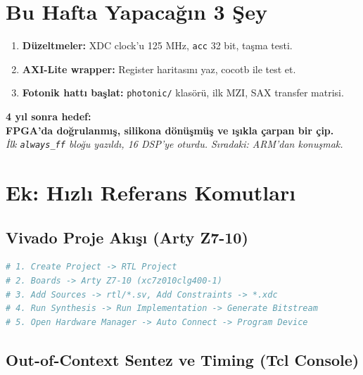 \documentclass[11pt,a4paper]{article}
\begin{document}
\section{Bu Hafta Yapacağın 3 Şey}

\begin{enumerate}
    \item \textbf{Düzeltmeler:} XDC clock'u 125 MHz, \texttt{acc} 32 bit, taşma testi.
    \item \textbf{AXI-Lite wrapper:} Register haritasını yaz, cocotb ile test et.
    \item \textbf{Fotonik hattı başlat:} \texttt{photonic/} klasörü, ilk MZI, SAX transfer matrisi.
\end{enumerate}

\begin{center}
\begin{tcolorbox}[colback=successbg, colframe=green!50!black, width=0.9\textwidth, arc=3mm]
\centering
\large\textbf{4 yıl sonra hedef:}\\[0.3cm]
\textbf{FPGA'da doğrulanmış, silikona dönüşmüş ve ışıkla çarpan bir çip.}\\[0.3cm]
\textit{İlk \texttt{always\_ff} bloğu yazıldı, 16 DSP'ye oturdu. Sıradaki: ARM'dan konuşmak.}
\end{tcolorbox}
\end{center}

\appendix

\section{Ek: Hızlı Referans Komutları}

\subsection{Vivado Proje Akışı (Arty Z7-10)}

\begin{lstlisting}[language=bash]
# 1. Create Project -> RTL Project
# 2. Boards -> Arty Z7-10 (xc7z010clg400-1)
# 3. Add Sources -> rtl/*.sv, Add Constraints -> *.xdc
# 4. Run Synthesis -> Run Implementation -> Generate Bitstream
# 5. Open Hardware Manager -> Auto Connect -> Program Device
\end{lstlisting}

\subsection{Out-of-Context Sentez ve Timing (Tcl Console)}
\end{document}
